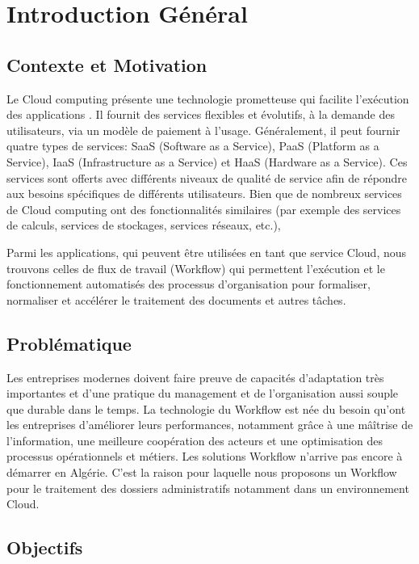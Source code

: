 \chapter*{Introduction Général }


\section*{Contexte et Motivation} 
Le Cloud computing  présente une technologie prometteuse qui facilite l'exécution des applications . Il fournit des services flexibles et évolutifs, à la demande des utilisateurs, via un modèle de paiement à l'usage. Généralement, il peut fournir quatre types de services: SaaS (Software as a Service), PaaS (Platform as a Service), IaaS (Infrastructure as a Service) et HaaS (Hardware as a Service). Ces services sont offerts avec différents niveaux de qualité de service afin de répondre aux besoins spécifiques de différents utilisateurs. Bien que de nombreux services de Cloud computing  ont des fonctionnalités similaires (par exemple des services de calculs, services de stockages, services  réseaux, etc.),

Parmi les  applications, qui peuvent être  utilisées en tant que service Cloud, nous trouvons celles de flux de travail (Workflow)  qui permettent l'exécution et le fonctionnement automatisés des processus d'organisation pour formaliser, normaliser et accélérer le traitement des documents et autres tâches.




\section*{Problématique}

Les entreprises modernes doivent faire preuve de capacités d'adaptation très importantes et d'une pratique du management et de l'organisation aussi souple que durable dans le temps.  La technologie du Workflow est née du besoin qu'ont les entreprises d'améliorer leurs performances, notamment grâce à une mâîtrise de l'information, une meilleure coopération des acteurs et une optimisation des processus opérationnels et métiers. Les solutions Workflow n’arrive pas encore à démarrer en Algérie. C’est la raison pour laquelle nous  proposons un Workflow pour le traitement des dossiers administratifs notamment dans un environnement Cloud.


 
\section*{Objectifs}


